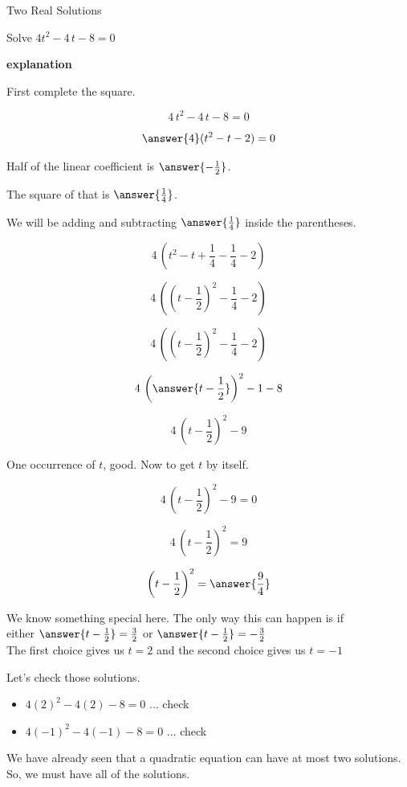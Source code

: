 \documentclass{ximera}
\begin{document}
\begin{example} Two Real Solutions

Solve $4  t^2 - 4 \, t - 8 = 0$ 


\textbf{\textcolor{red!75!green}{explanation}} 


First complete the square.



\[ 4 \, t^2 -  4 \, t - 8 = 0 \]

\[ \answer{4} (t^2 - t - 2) = 0 \]



Half of the linear coefficient is $\answer{-\frac{1}{2}}$. 

The square of that is $\answer{\frac{1}{4}}$. 

We will be adding and subtracting $\answer{\frac{1}{4}}$ inside the parentheses.




\[ 4 \, (t^2 - t + \frac{1}{4} - \frac{1}{4} - 2)  \]


\[ 4 \, \left(\left(t - \frac{1}{2}\right)^2 - \frac{1}{4} - 2\right)  \]


\[ 4 \, \left(\left(t - \frac{1}{2}\right)^2 - \frac{1}{4} - 2\right)  \]

\[ 4 \, \left( \answer{t - \frac{1}{2}} \right)^2 - 1 - 8  \]

\[ 4 \, \left(t - \frac{1}{2}\right)^2 - 9  \]


One occurrence of $t$, good. Now to get $t$ by itself.

\[ 4 \, \left(t - \frac{1}{2}\right)^2 - 9 = 0  \]

\[ 4 \, \left(t - \frac{1}{2}\right)^2 = 9  \]

\[  \left(t - \frac{1}{2}\right)^2 = \answer{\frac{9}{4}}  \]

We know something special here. The only way this can happen is if \\



either   $\answer{t - \frac{1}{2}} = \frac{3}{2}$  or  $\answer{t - \frac{1}{2}} = -\frac{3}{2}$ \\

The first choice gives us $t = 2$ and the second choice gives us $t = -1$




Let's check those solutions.

\begin{itemize}
\item $4 (2)^2 - 4 (2) - 8 = 0$ ... check
\item $4 (-1)^2 - 4 (-1) - 8 = 0$ ... check
\end{itemize}



We have already seen that a quadratic equation can have at most two solutions.  So, we must have all of the solutions.




\end{example}
\end{document}
